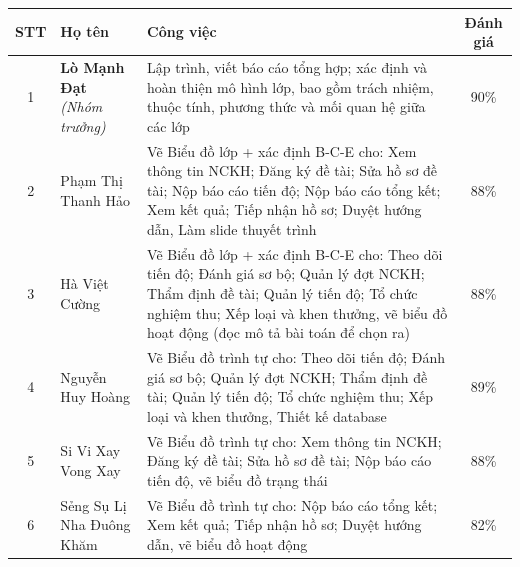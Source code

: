 \begin{taskassignment}
  \centering
  \begin{tabular}{|c|p{3.0cm}|p{8.4cm}|c|}
    \hline
    \textbf{STT} & \textbf{Họ tên}                                      & \textbf{Công việc}                                                                                                                                                                                                            & \textbf{Đánh giá} \\ \hline
    1            & \textbf{Lò Mạnh Đạt} \newline \textit{(Nhóm trưởng)} & Lập trình, viết báo cáo tổng hợp; xác định và hoàn thiện mô hình lớp, bao gồm trách nhiệm, thuộc tính, phương thức và mối quan hệ giữa các lớp                                                                                & 90\%              \\ \hline
    2            & Phạm Thị Thanh Hảo                                   & Vẽ Biểu đồ lớp + xác định B-C-E cho: Xem thông tin NCKH; Đăng ký đề tài; Sửa hồ sơ đề tài; Nộp báo cáo tiến độ; Nộp báo cáo tổng kết; Xem kết quả; Tiếp nhận hồ sơ; Duyệt hướng dẫn, Làm slide thuyết trình                   & 88\%              \\ \hline
    3            & Hà Việt Cường                                        & Vẽ Biểu đồ lớp + xác định B-C-E cho: Theo dõi tiến độ; Đánh giá sơ bộ; Quản lý đợt NCKH; Thẩm định đề tài; Quản lý tiến độ; Tổ chức nghiệm thu; Xếp loại và khen thưởng, vẽ biểu đồ hoạt động (đọc mô tả bài toán để chọn ra) & 88\%              \\ \hline
    4            & Nguyễn Huy Hoàng                                     & Vẽ Biểu đồ trình tự cho: Theo dõi tiến độ; Đánh giá sơ bộ; Quản lý đợt NCKH; Thẩm định đề tài; Quản lý tiến độ; Tổ chức nghiệm thu; Xếp loại và khen thưởng, Thiết kế database                                                & 89\%              \\ \hline
    5            & Si Vi Xay Vong Xay                                   & Vẽ Biểu đồ trình tự cho: Xem thông tin NCKH; Đăng ký đề tài; Sửa hồ sơ đề tài; Nộp báo cáo tiến độ, vẽ biểu đồ trạng thái                                                                                                     & 88\%              \\ \hline
    6            & Sẻng Sụ Lị Nha Đuông Khăm                            & Vẽ Biểu đồ trình tự cho: Nộp báo cáo tổng kết; Xem kết quả; Tiếp nhận hồ sơ; Duyệt hướng dẫn, vẽ biểu đồ hoạt động                                                                                                            & 82\%              \\ \hline
  \end{tabular}
\end{taskassignment}
